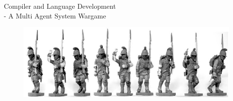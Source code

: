 
\begin{center}

\fontsize{25}{50}\selectfont\sffamily Compiler and Language Development\\
\fontsize{18}{36}\selectfont\sffamily - A Multi Agent System Wargame\\ \vspace{1cm}

\end{center}


\begin{figure}[htb]
\begin{center}
\includegraphics[scale=0.6]{Images/frontpage_pic.png}
\end{center}
\end{figure}
